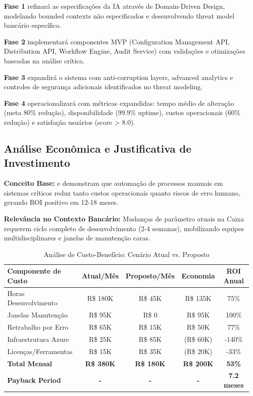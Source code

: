 \textbf{Fase 1} refinará as especificações da IA através de Domain-Driven Design, modelando bounded contexts não especificados e desenvolvendo threat model bancário específico.

\textbf{Fase 2} implementará componentes MVP (Configuration Management API, Distribution API, Workflow Engine, Audit Service) com validações e otimizações baseadas na análise crítica.

\textbf{Fase 3} expandirá o sistema com anti-corruption layers, advanced analytics e controles de segurança adicionais identificados no threat modeling.

\textbf{Fase 4} operacionalizará com métricas expandidas: tempo médio de alteração (meta 80\% redução), disponibilidade (99.9\% uptime), custos operacionais (60\% redução) e satisfação usuários (score > 8.0).

\subsection{Análise Econômica e Justificativa de Investimento}

\textbf{Conceito Base:}  e  demonstram que automação de processos manuais em sistemas críticos reduz tanto custos operacionais quanto riscos de erro humano, gerando ROI positivo em 12-18 meses.

\textbf{Relevância no Contexto Bancário:} Mudanças de parâmetro atuais na Caixa requerem ciclo completo de desenvolvimento (2-4 semanas), mobilizando equipes multidisciplinares e janelas de manutenção caras.

\begin{table}[h]
\centering
\caption{Análise de Custo-Benefício: Cenário Atual vs. Proposto}
\label{tab:analise-custo-beneficio}
\footnotesize
\begin{tabular}{|l|c|c|c|c|}
\hline
\rowcolor{azulPrincipal!10}
\textbf{Componente de Custo} & \textbf{Atual/Mês} & \textbf{Proposto/Mês} & \textbf{Economia} & \textbf{ROI Anual}\\
\hline
\rowcolor{azulSecundario!5}
Horas Desenvolvimento & R\$ 180K & R\$ 45K & R\$ 135K & 75\% \\
\hline
Janelas Manutenção & R\$ 95K & R\$ 0 & R\$ 95K & 100\% \\
\hline
\rowcolor{azulSecundario!5}
Retrabalho por Erro & R\$ 65K & R\$ 15K & R\$ 50K & 77\% \\
\hline
Infraestrutura Azure & R\$ 25K & R\$ 85K & (R\$ 60K) & -140\% \\
\hline
\rowcolor{azulSecundario!5}
Licenças/Ferramentas & R\$ 15K & R\$ 35K & (R\$ 20K) & -33\% \\
\hline
\textbf{Total Mensal} & \textbf{R\$ 380K} & \textbf{R\$ 180K} & \textbf{R\$ 200K} & \textbf{53\%} \\
\hline
\textbf{Payback Period} & \textbf{-} & \textbf{-} & \textbf{-} & \textbf{7.2 meses} \\
\hline
\end{tabular}
\end{table}


